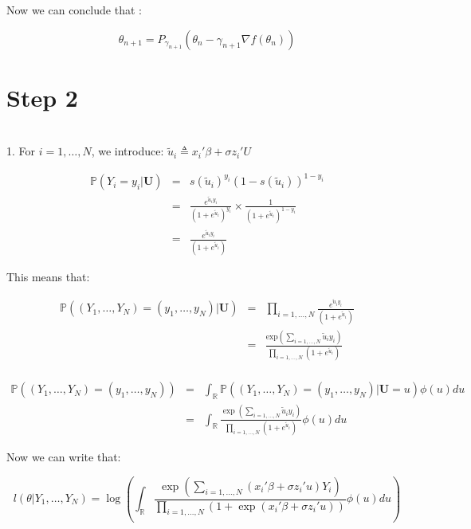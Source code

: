 Now we can conclude that :

$$\theta_{n+1}=P_{\gamma_{n+1}} (\theta_n-\gamma_{n+1}\nabla f(\theta_n))$$

\section*{Step 2}
~\\

1. For $i=1,\dots,N$, we introduce: $\tilde{u}_i\triangleq x_i' \beta + \sigma z_i'U$

\begin{eqnarray*}
	\mathbb{P}(Y_i=y_i\vert \textbf{U})&=& s(\tilde{u}_i)^{y_i}(1-s(\tilde{u}_i))^{1-y_i}\\
														&=& \frac{e^{\tilde{u}_i y_i}}{(1+e^{\tilde{u}_i})^{y_i}}\times \frac{1}{(1+e^{\tilde{u}_i})^{1-y_i}}\\
														&=& \frac{e^{\tilde{u}_i y_i}}{(1+e^{\tilde{u}_i})}
\end{eqnarray*}

This means that:

\begin{eqnarray*}
	\mathbb{P}((Y_1,\dots,Y_N)=(y_1,\dots,y_N)\vert \textbf{U})&=& \prod_{i=1,\dots,N}\frac{e^{\tilde{u}_i y_i}}{(1+e^{\tilde{u}_i})}\\
											&=& \frac{\text{exp}(\sum_{i=1,\dots,N}\tilde{u}_i y_i)}{\prod_{i=1,\dots,N}(1+e^{\tilde{u}_i})}\\
\end{eqnarray*}

\begin{eqnarray*}
	\mathbb{P}((Y_1,\dots,Y_N)=(y_1,\dots,y_N))&=&\int_{\mathbb{R}}\mathbb{P}((Y_1,\dots,Y_N)=(y_1,\dots,y_N)\vert \textbf{U}=u) \phi(u) du\\
											&=& \int_{\mathbb{R}} \frac{\exp(\sum_{i=1,\dots,N}\tilde{u}_i y_i)}{\prod_{i=1,\dots,N}(1+e^{\tilde{u}_i})} \phi(u) du
\end{eqnarray*}

Now we can write that:

$$l(\theta\vert Y_1,\dots,Y_N)=\log(\int_{\mathbb{R}} \frac{\exp(\sum_{i=1,\dots,N}(x_i' \beta + \sigma z_i'u) Y_i)}{\prod_{i=1,\dots,N}(1+\exp(x_i' \beta + \sigma z_i'u))} \phi(u) du)$$

